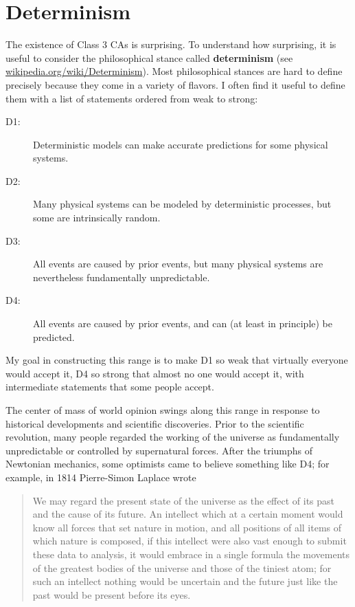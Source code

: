 \documentclass[10pt]{book}
\begin{document}
\section{Determinism}

The existence of Class 3 CAs is surprising.  To understand how
surprising, it is useful to consider the philosophical stance called
{\bf determinism} (see \url{wikipedia.org/wiki/Determinism}).
Most philosophical stances are hard to define precisely because
they come in a variety of flavors.  I often find it useful
to define them with a list of statements ordered from weak
to strong:

\begin{description}

\item[D1:] Deterministic models can make accurate predictions
for some physical systems.

\item[D2:] Many physical systems can be modeled by deterministic
processes, but some are intrinsically random.

\item[D3:] All events are caused by prior events, but many
physical systems are nevertheless fundamentally unpredictable.

\item[D4:] All events are caused by prior events, and can (at
least in principle) be predicted.

\end{description}

My goal in constructing this range is to make D1 so weak that
virtually everyone would accept it, D4 so strong that almost no one
would accept it, with intermediate statements that some people accept.

The center of mass of world opinion swings along this range in
response to historical developments and scientific discoveries.  Prior
to the scientific revolution, many people regarded the working of the
universe as fundamentally unpredictable or controlled by supernatural
forces.  After the triumphs of Newtonian mechanics, some optimists
came to believe something like D4; for example, in 1814 Pierre-Simon
Laplace wrote

\begin{quote}
We may regard the present state of the universe as the effect of its
past and the cause of its future. An intellect which at a certain
moment would know all forces that set nature in motion, and all
positions of all items of which nature is composed, if this intellect
were also vast enough to submit these data to analysis, it would
embrace in a single formula the movements of the greatest bodies of
the universe and those of the tiniest atom; for such an intellect
nothing would be uncertain and the future just like the past would be
present before its eyes.
\end{quote}
\end{document}
